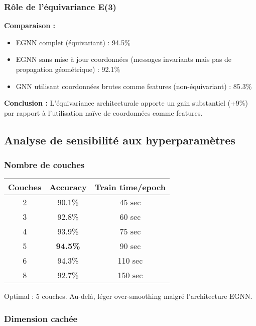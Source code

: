 \subsubsection{Rôle de l'équivariance E(3)}

\textbf{Comparaison :}
\begin{itemize}
    \item EGNN complet (équivariant) : 94.5\%
    \item EGNN sans mise à jour coordonnées (messages invariants mais pas de propagation géométrique) : 92.1\%
    \item GNN utilisant coordonnées brutes comme features (non-équivariant) : 85.3\%
\end{itemize}

\textbf{Conclusion :}
L'équivariance architecturale apporte un gain substantiel (+9\%) par rapport à l'utilisation naïve de coordonnées comme features.

\subsection{Analyse de sensibilité aux hyperparamètres}

\subsubsection{Nombre de couches}

\begin{center}
\begin{tabular}{|c|c|c|}
\hline
\textbf{Couches} & \textbf{Accuracy} & \textbf{Train time/epoch} \\
\hline
2 & 90.1\% & 45 sec \\
3 & 92.8\% & 60 sec \\
4 & 93.9\% & 75 sec \\
5 & \textbf{94.5\%} & 90 sec \\
6 & 94.3\% & 110 sec \\
8 & 92.7\% & 150 sec \\
\hline
\end{tabular}
\end{center}

Optimal : 5 couches. Au-delà, léger over-smoothing malgré l'architecture EGNN.

\subsubsection{Dimension cachée}

